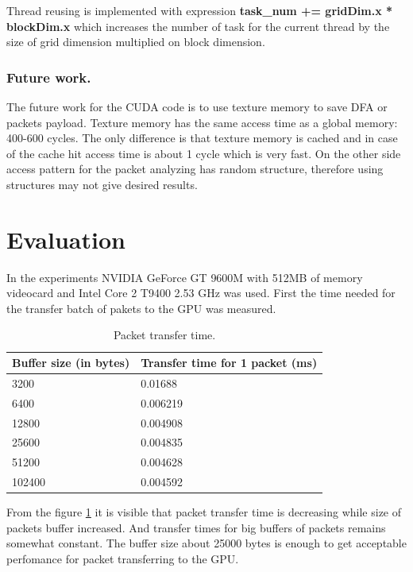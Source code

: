 \documentclass[thesis=M,english]{FITthesis}[2011/07/15]
\begin{document}
Thread reusing is implemented with expression \textbf{task\_num += gridDim.x * blockDim.x} which increases the number of task for the current thread by the size of grid dimension multiplied on block dimension.

\subsubsection*{Future work.}
The future work for the CUDA code is to use texture memory to save DFA or packets payload. Texture memory has the same access time as a global memory: 400-600 cycles. The only difference is that texture memory is cached and in case of the cache hit access time is about 1 cycle which is very fast. On the other side access pattern for the packet analyzing has random structure, therefore using structures may not give desired results.

\section{Evaluation}
In the experiments NVIDIA GeForce GT 9600M with 512MB of memory videocard and Intel Core 2 T9400 2.53 GHz was used. First the time needed for the transfer batch of pakets to the GPU was measured.

\begin{table}[h]
\centering
\begin{tabular}{| l | l |}
\hline
Buffer size (in bytes) & Transfer time for 1 packet (ms) \\ \hline
3200 & 0.01688 \\ \hline
6400 & 0.006219 \\ \hline
12800 & 0.004908 \\ \hline
25600 & 0.004835 \\ \hline
51200 & 0.004628 \\ \hline
102400 & 0.004592 \\ \hline
\end{tabular}
\caption{Packet transfer time.}
\label{fig:packet_transfer_times}
\end{table}

From the figure \ref{fig:packet_transfer_times} it is visible that packet transfer time is decreasing while size of packets buffer increased. And transfer times for big buffers of packets remains somewhat constant. The buffer size about 25000 bytes is enough to get acceptable perfomance for packet transferring to the GPU.
\end{document}
